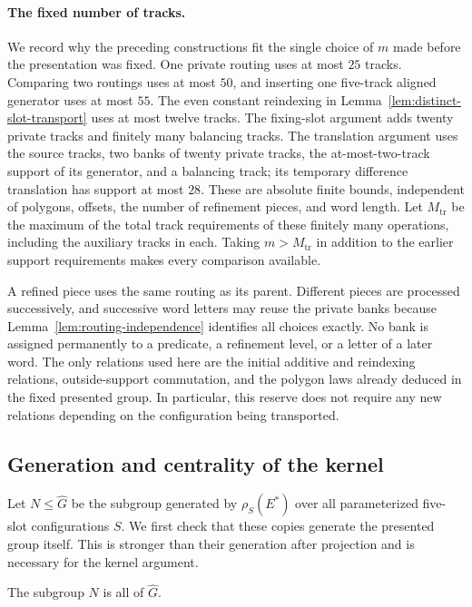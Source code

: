\paragraph{The fixed number of tracks.}
We record why the preceding constructions fit the single choice of $m$
made before the presentation was fixed.  One private routing uses at most
$25$ tracks.  Comparing two routings uses at most $50$, and inserting one
five-track aligned generator uses at most $55$.  The even constant
reindexing in Lemma~\ref{lem:distinct-slot-transport} uses at most twelve
tracks.  The fixing-slot argument adds twenty private tracks and finitely
many balancing tracks.  The translation argument uses the source tracks,
two banks of twenty private tracks, the at-most-two-track support of its
generator, and a balancing track; its temporary difference translation
has support at most $28$.  These are absolute finite bounds, independent
of polygons, offsets, the number of refinement pieces, and word length.
Let $M_{\mathrm{tr}}$ be the maximum of the total track requirements
of these finitely many operations, including the auxiliary tracks in
each.  Taking $m>M_{\mathrm{tr}}$ in addition to the earlier support
requirements makes every comparison available.

A refined piece uses the same routing as its parent.  Different pieces
are processed successively, and successive word letters may reuse the
private banks because Lemma~\ref{lem:routing-independence} identifies all
choices exactly.  No bank is assigned permanently to a predicate, a
refinement level, or a letter of a later word.  The only relations used
here are the initial additive and reindexing relations, outside-support
commutation, and the polygon laws already deduced in the fixed presented
group.  In particular, this reserve does not require any new relations
depending on the configuration being transported.

\subsection{Generation and centrality of the kernel}

Let $N\leq\widehat G$ be the subgroup generated by
$\rho_S(E^\ast)$ over all parameterized five-slot configurations $S$.
We first check that these copies generate the presented group itself.
This is stronger than their generation after projection and is necessary
for the kernel argument.

\begin{lemma}\label{lem:slot-generation}
The subgroup $N$ is all of $\widehat G$.
\end{lemma}

